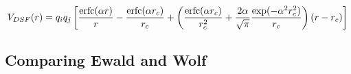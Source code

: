\documentclass[thesis]{subfiles}
\begin{document}
\[V_{DSF}(r) = q_i q_j \left[\frac{\text{erfc}(\alpha r)}{r} - \frac{\text{erfc}(\alpha r_c)}{r_c}
+ \left(\frac{\text{erfc}(\alpha r_c)}{r_c^2} + \frac{2\alpha}{\sqrt{\pi}} \frac{\exp(-\alpha^2 r_c^2)}{r_c}\right) (r - r_c)\right]\]


\TODO \cite{Fukuda2013}

\subsection{Comparing Ewald and Wolf}

\OnlyInSubfile{\printbibliography}
\end{document}
